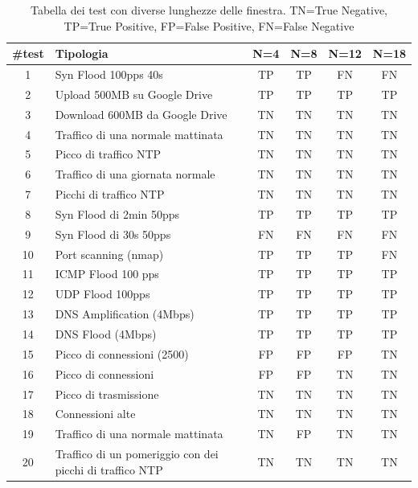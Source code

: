 \begin{table}
    \begin{tabularx}{\textwidth}{||c X c c c c||} 
        \hline
        \#test & Tipologia & N=4 & N=8 & N=12 & N=18\\ [0.5ex] 
        \hline\hline
        1 & Syn Flood 100pps 40s & TP & TP & FN & FN\\ 
        \hline
        2 & Upload 500MB su Google Drive & TP & TP & TP & TP\\ 
        \hline
        3 &  Download 600MB da Google Drive & TN  & TN & TN & TN\\ 
        \hline 
        4 & Traffico di una normale mattinata & TN & TN & TN & TN\\
        \hline
        5 & Picco di traffico NTP & TN & TN & TN & TN\\
        \hline
        6 & Traffico di una giornata normale & TN & TN & TN & TN\\ 
        \hline
        7 & Picchi di traffico NTP & TN & TN & TN & TN\\ 
        \hline 
        8 & Syn Flood di 2min 50pps & TP & TP & TP & TP\\
        \hline
        9 & Syn Flood di 30s 50pps & FN & FN & FN & FN\\        
        \hline
        10 & Port scanning (nmap) & TP & TP & TP & FN\\
        \hline
        11 & ICMP Flood 100 pps & TP & TP & TP & TP\\
        \hline
        12 & UDP Flood 100pps & TP & TP & TP & TP\\ 
        \hline
        13 & DNS Amplification (4Mbps) & TP & TP & TP & TP\\ 
        \hline 
        14 & DNS Flood (4Mbps) & TP & TP & TP & TP\\
        \hline
        15 & Picco di connessioni (2500) & FP & FP & FP & TN \\        
        \hline 
        16 & Picco di connessioni & FP & FP & TN & TN\\        
        \hline
        17 & Picco di trasmissione & TN & TN & TN & TN\\        
        \hline
        18 & Connessioni alte & TN & TN & TN & TN\\
        \hline
        19 & Traffico di una normale mattinata & TN & FP & TN & TN\\ 
        \hline
        20 & Traffico di un pomeriggio con dei picchi di traffico NTP & TN & TN & TN & TN\\ 
        \hline
    \end{tabularx}
    \caption{Tabella dei test con diverse lunghezze delle finestra. TN=True Negative, TP=True Positive, FP=False Positive, FN=False Negative}
    \label{table:finestra}
\end{table}

